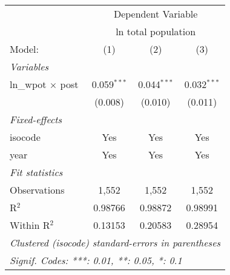 
\begingroup
\centering
\begin{tabular}{lccc}
   \tabularnewline \midrule \midrule
     & \multicolumn{3}{c}{Dependent Variable} \\ 
     & \multicolumn{3}{c}{ln total population} \\ 
   Model:                   & (1)           & (2)           & (3)\\  
   \midrule
   \emph{Variables}\\
   ln\_wpot $\times$ post   & 0.059$^{***}$ & 0.044$^{***}$ & 0.032$^{***}$\\   
                            & (0.008)       & (0.010)       & (0.011)\\   
   \midrule
   \emph{Fixed-effects}\\
   isocode                  & Yes           & Yes           & Yes\\  
   year                     & Yes           & Yes           & Yes\\  
   \midrule
   \emph{Fit statistics}\\
   Observations             & 1,552         & 1,552         & 1,552\\  
   R$^2$                    & 0.98766       & 0.98872       & 0.98991\\  
   Within R$^2$             & 0.13153       & 0.20583       & 0.28954\\  
   \midrule \midrule
   \multicolumn{4}{l}{\emph{Clustered (isocode) standard-errors in parentheses}}\\
   \multicolumn{4}{l}{\emph{Signif. Codes: ***: 0.01, **: 0.05, *: 0.1}}\\
\end{tabular}
\par\endgroup


